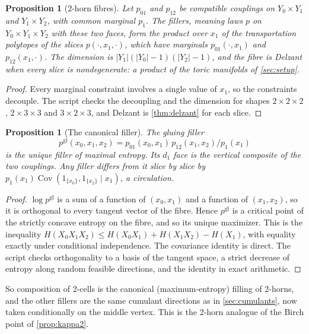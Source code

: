\documentclass[11pt]{article}
\newtheorem{proposition}[theorem]{Proposition}
\theoremstyle{definition}
\theoremstyle{remark}
\begin{document}
\begin{proposition}[2-horn fibres]\label{prop:2horn}
Let $p_{01}$ and $p_{12}$ be compatible couplings on $Y_0\times Y_1$ and $Y_1\times Y_2$, with common marginal $p_1$. The
fillers, meaning laws $p$ on $Y_0\times Y_1\times Y_2$ with these two faces, form the product over $x_1$ of the
transportation polytopes of the slices $p(\cdot,x_1,\cdot)$, which have marginals $p_{01}(\cdot,x_1)$ and $p_{12}(x_1,\cdot)$. The
dimension is $\lvert Y_1\rvert(\lvert Y_0\rvert-1)(\lvert Y_2\rvert-1)$, and the fibre is Delzant when every slice is
nondegenerate: a product of the toric manifolds of \cref{sec:setup}.
\end{proposition}
\begin{proof}
Every marginal constraint involves a single value of $x_1$, so the constraints decouple. The script checks the
decoupling and the dimension for shapes $2\times2\times2$, $2\times3\times3$ and $3\times2\times3$, and Delzant is
\cref{thm:delzant} for each slice.
\end{proof}

\begin{proposition}[The canonical filler]\label{prop:canonical}
The gluing filler
\[
p^{\mathrm{gl}}(x_0,x_1,x_2)=p_{01}(x_0,x_1)\,p_{12}(x_1,x_2)/p_1(x_1)
\]
is the unique filler of maximal entropy. Its $d_1$ face is the vertical composite of the two couplings. Any filler differs from it slice by slice
by $p_1(x_1)\operatorname{Cov}(1_{\{x_0\}},1_{\{x_2\}}\mid x_1)$, a circulation.
\end{proposition}
\begin{proof}
$\log p^{\mathrm{gl}}$ is a sum of a function of $(x_0,x_1)$ and a function of $(x_1,x_2)$, so it is orthogonal to every
tangent vector of the fibre. Hence $p^{\mathrm{gl}}$ is a critical point of the strictly concave entropy on the fibre,
and so its unique maximizer. This is the inequality $H(X_0X_1X_2)\le H(X_0X_1)+H(X_1X_2)-H(X_1)$, with
equality exactly under conditional independence. The covariance identity is direct. The script checks
orthogonality to a basis of the tangent space, a strict decrease of entropy along random feasible directions,
and the identity in exact arithmetic.
\end{proof}

So composition of 2-cells is the canonical (maximum-entropy) filling of 2-horns, and the other fillers are the
same cumulant directions as in \cref{sec:cumulants}, now taken conditionally on the middle vertex. This is the
2-horn analogue of the Birch point of \cref{prop:kappa2}.
\end{document}
